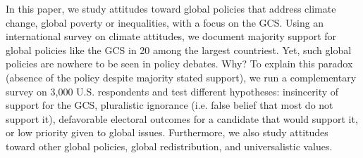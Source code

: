 In this paper, we study attitudes toward global policies that address climate change, global poverty or inequalities, with a focus on the GCS. Using an international survey on climate attitudes, we document majority support for global policies like the GCS in 20 among the largest countriest. Yet, such global policies are nowhere to be seen in policy debates. Why? To explain this paradox (absence of the policy despite majority stated support), we run a complementary survey on 3,000 U.S. respondents and test different hypotheses: insincerity of support for the GCS, pluralistic ignorance (i.e. false belief that most do not support it), defavorable electoral outcomes for a candidate that would support it, or low priority given to global issues. Furthermore, we also study attitudes toward other global policies, global redistribution, and universalistic values.



